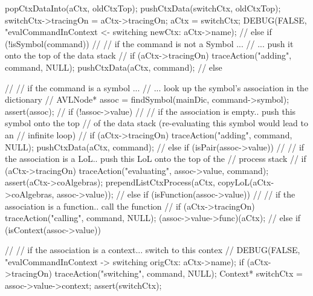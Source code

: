 {{{      popCtxDataInto(aCtx, oldCtxTop);
      pushCtxData(switchCtx, oldCtxTop);
      switchCtx->tracingOn = aCtx->tracingOn;
      aCtx = switchCtx;
      DEBUG(FALSE, "evalCommandInContext <- switching newCtx: %
            aCtx->name);
      //
    } else if (!isSymbol(command)) {
      //
      // if the command is not a Symbol ...
      //  ...  push it onto the top of the data stack
      //
      if (aCtx->tracingOn) traceAction("adding", command, NULL);
      pushCtxData(aCtx, command);
      //
    } else {
      //
      // if the command is a symbol ...
      //  ... look up the symbol's association in the dictionary
      //
      AVLNode* assoc = findSymbol(mainDic, command->symbol);
      assert(assoc);
      //
      if (!assoc->value) {
        //
        // if the association is empty.. push this symbol onto the top
        // of the data stack (re-evaluating this symbol would lead to an
        // infinite loop)
        //
        if (aCtx->tracingOn) traceAction("adding", command, NULL);
        pushCtxData(aCtx, command);
        //
      } else if (isPair(assoc->value)) {
        //
        // if the association is a LoL.. push this LoL onto the top of the
        // process stack
        //
        if (aCtx->tracingOn) traceAction("evaluating", assoc->value, command);
        assert(aCtx->coAlgebras);
        prependListCtxProcess(aCtx, copyLoL(aCtx->coAlgebras, assoc->value));
        //
      } else if (isFunction(assoc->value)) {
        //
        // if the association is a function.. call the function
        //
        if (aCtx->tracingOn) traceAction("calling", command, NULL);
        (assoc->value->func)(aCtx);
        //
      } else if (isContext(assoc->value)) {
        //
        // if the association is a context... switch to this contex
        //
        DEBUG(FALSE, "evalCommandInContext -> switching origCtx: %
              aCtx->name);
        if (aCtx->tracingOn) traceAction("switching", command, NULL);
        Context* switchCtx = assoc->value->context;
        assert(switchCtx);

}}}}
